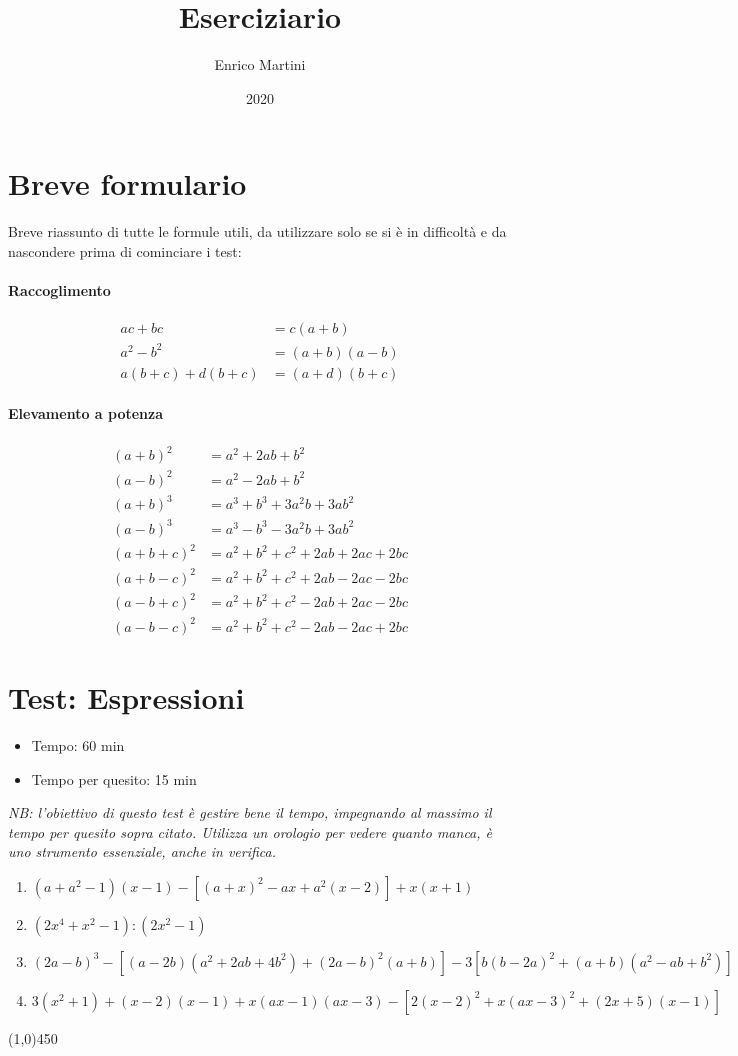 \documentclass[a4paper]{article}
\title{Eserciziario}
\date{2020}
\author{Enrico Martini}
\begin{document}
\maketitle
\tableofcontents
\newpage
\setcounter{section}{-1}
\section{Breve formulario}
Breve riassunto di tutte le formule utili, da utilizzare solo se si è in difficoltà e da nascondere prima di cominciare i test:
\paragraph{Raccoglimento}
\begin{align*}
	ac + bc &= c(a+b)\\
	a^2-b^2 &= (a+b)(a-b)\\
	a(b+c) + d(b+c) &= (a+d)(b+c)
\end{align*}
\paragraph{Elevamento a potenza}
\begin{align*}
(a+b)^2 &= a^2 + 2ab + b^2\\
(a-b)^2 &= a^2 - 2ab + b^2\\
(a+b)^3 &= a^3 + b^3 + 3a^2b + 3ab^2\\
(a-b)^3 &= a^3 - b^3 - 3a^2b + 3ab^2\\
(a+b+c)^2 &= a^2 + b^2 + c^2 + 2ab + 2ac + 2bc\\
(a+b-c)^2 &= a^2 + b^2 + c^2 + 2ab - 2ac - 2bc\\
(a-b+c)^2 &= a^2 + b^2 + c^2 - 2ab + 2ac - 2bc\\
(a-b-c)^2 &= a^2 + b^2 + c^2 - 2ab - 2ac + 2bc
\end{align*}

\newpage
\section{Test: Espressioni }
\begin{itemize}
\item Tempo: 60 min
\item Tempo per quesito: 15 min 
\end{itemize}
\textit{NB: l'obiettivo di questo test è gestire bene il tempo, impegnando al massimo il tempo per quesito sopra citato. Utilizza un orologio per vedere quanto manca, è uno strumento essenziale, anche in verifica.}
\begin{enumerate}
\item $(a+a^2-1)(x-1)-[(a+x)^2-ax+a^2(x-2)]+x(x+1)$	%
\item $(2x^4+x^2-1):(2x^2-1)$
\item $(2a-b)^3-[(a-2b)(a^2+2ab+4b^2)+(2a-b)^2(a+b)]-3[b(b-2a)^2+(a+b)(a^2-ab+b^2)]$	%
\item $3(x^2+1)+(x-2)(x-1)+x(ax-1)(ax-3)-[2(x-2)^2+x(ax-3)^2+(2x+5)(x-1)]$
\end{enumerate}
\begin{center}
	\line(1,0){450}
\end{center}
\end{document}
